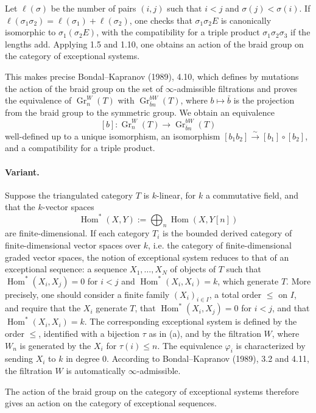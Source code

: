 \documentclass[11pt]{article}
\newcommand{\Hom}{\operatorname{Hom}}
\newcommand{\Gr}{\operatorname{Gr}}
\begin{document}
Let $\ell(\sigma)$ be the number of pairs $(i,j)$ such that $i<j$ and $\sigma(j)<\sigma(i)$. If $\ell(\sigma_1\sigma_2)=\ell(\sigma_1)+\ell(\sigma_2)$, one checks that $\sigma_1\sigma_2E$ is canonically isomorphic to $\sigma_1(\sigma_2E)$, with the compatibility for a triple product $\sigma_1\sigma_2\sigma_3$ if the lengths add. Applying 1.5 and 1.10, one obtains an action of the braid group on the category of exceptional systems.

This makes precise Bondal--Kapranov (1989), 4.10, which defines by mutations the action of the braid group on the set of $\infty$-admissible filtrations and proves the equivalence of $\Gr^W_n(T)$ with $\Gr^{bW}_{\bar b n}(T)$, where $b\mapsto\bar b$ is the projection from the braid group to the symmetric group. We obtain an equivalence
\[
 [b]:\Gr^W_n(T)\longrightarrow \Gr^{bW}_{\bar b n}(T)
\]
well-defined up to a unique isomorphism, an isomorphism $[b_1b_2]\xrightarrow{\sim}[b_1]\circ[b_2]$, and a compatibility for a triple product.

\paragraph{Variant.} Suppose the triangulated category $T$ is $k$-linear, for $k$ a commutative field, and that the $k$-vector spaces
\[
 \Hom^*(X,Y):=\bigoplus_n\Hom(X,Y[n])
\]
are finite-dimensional. If each category $T_i$ is the bounded derived category of finite-dimensional vector spaces over $k$, i.e. the category of finite-dimensional graded vector spaces, the notion of exceptional system reduces to that of an exceptional sequence: a sequence $X_1,\ldots,X_N$ of objects of $T$ such that $\Hom^*(X_i,X_j)=0$ for $i<j$ and $\Hom^*(X_i,X_i)=k$, which generate $T$. More precisely, one should consider a finite family $(X_i)_{i\in I}$, a total order $\leq$ on $I$, and require that the $X_i$ generate $T$, that $\Hom^*(X_i,X_j)=0$ for $i<j$, and that $\Hom^*(X_i,X_i)=k$. The corresponding exceptional system is defined by the order $\leq$, identified with a bijection $\tau$ as in (a), and by the filtration $W$, where $W_n$ is generated by the $X_i$ for $\tau(i)\leq n$. The equivalence $\varphi_i$ is characterized by sending $X_i$ to $k$ in degree $0$. According to Bondal--Kapranov (1989), 3.2 and 4.11, the filtration $W$ is automatically $\infty$-admissible.

The action of the braid group on the category of exceptional systems therefore gives an action on the category of exceptional sequences.
\end{document}

